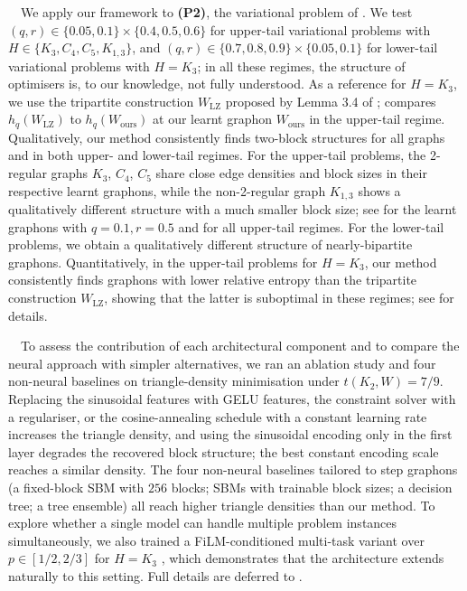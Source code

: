 \documentclass{article}
\theoremstyle{plain}
\theoremstyle{definition}
\theoremstyle{remark}
\begin{document}
\ $\,$
We apply our framework to \textbf{(P2)}, the variational problem of \citet{chatterjee2011large}. 
We test $(q, r) \in \{0.05, 0.1\} \times \{0.4, 0.5, 0.6\}$ for upper-tail variational problems with $H \in \{K_3, C_4, C_5, K_{1,3}\}$, and $(q, r) \in \{0.7, 0.8, 0.9\} \times \{0.05, 0.1\}$ for lower-tail variational problems with $H = K_3$; in all these regimes, the structure of optimisers is, to our knowledge, not fully understood. As a reference for $H = K_3$, we use the tripartite construction $W_{\mathrm{LZ}}$ proposed by Lemma 3.4 of \citet{lubetzky2015replica};  compares $h_q(W_{\mathrm{LZ}})$ to $h_q(W_{\mathrm{ours}})$ at our learnt graphon $W_{\mathrm{ours}}$ in the upper-tail regime.
Qualitatively, our method consistently finds two-block structures for all graphs and in both upper- and lower-tail regimes.
For the upper-tail problems, the 2-regular graphs $K_3$, $C_4$, $C_5$ share close edge densities and block sizes in their respective learnt graphons, while the non-2-regular graph $K_{1,3}$ shows a qualitatively different structure with a much smaller block size; see  for the learnt graphons with $q=0.1, r=0.5$ and  for all upper-tail regimes.
For the lower-tail problems, we obtain a qualitatively different structure of nearly-bipartite graphons.
Quantitatively, in the upper-tail problems for $H = K_3$, our method consistently finds graphons with lower relative entropy than the tripartite construction $W_{\mathrm{LZ}}$, showing that the latter is suboptimal in these regimes; see  for details.

\  $\,$
To assess the contribution of each architectural component and to compare the neural approach with simpler alternatives, we ran an ablation study and four non-neural baselines on triangle-density minimisation under $t(K_2, W) = 7/9$. Replacing the sinusoidal features with GELU features, the constraint solver with a regulariser, or the cosine-annealing schedule with a constant learning rate increases the triangle density, and using the sinusoidal encoding only in the first layer degrades the recovered block structure; the best constant encoding scale reaches a similar density. The four non-neural baselines tailored to step graphons (a fixed-block SBM with $256$ blocks; SBMs with trainable block sizes; a decision tree; a tree ensemble) all reach higher triangle densities than our method. To explore whether a single model can handle multiple problem instances simultaneously, we also trained a FiLM-conditioned multi-task variant over $p \in [1/2, 2/3]$ for $H = K_3$ \citep{perez2018film}, which demonstrates that the architecture extends naturally to this setting. Full details are deferred to .
\end{document}
